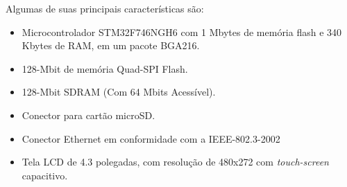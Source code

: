 Algumas de suas principais características são:
\begin{itemize}
    \item Microcontrolador STM32F746NGH6 com 1 Mbytes de memória flash e 340 Kbytes de RAM, em um pacote BGA216.
    \item 128-Mbit de memória Quad-SPI Flash.
    \item 128-Mbit SDRAM (Com 64 Mbits Acessível).
    \item Conector para cartão microSD.
    \item Conector Ethernet em conformidade com a IEEE-802.3-2002
    \item Tela LCD de 4.3 polegadas, com resolução de 480x272 com \textit{touch-screen} capacitivo.
    
\end{itemize}